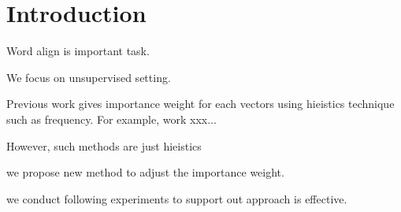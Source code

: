 \section{Introduction}
	\begin{comment}
	awesome introduction.
	\begin{itemize}
		\item[Task]{Unsupervised word alignment.}
		\item[Research Questions]{Word embeddings include noisy vectors for word alignment.}
		\item[Approach]{Learn importance weights for each vectors to mitigate the noise.}
	\end{itemize}
	\end{comment}

	Word align is important task.

	We focus on unsupervised setting.

	Previous work gives importance weight for each vectors
		using hieistics technique such as frequency.
	For example, work xxx...

	However, such methods are just hieistics

	we propose new method to adjust the importance weight.

	we conduct following experiments to support out approach is effective.
	
